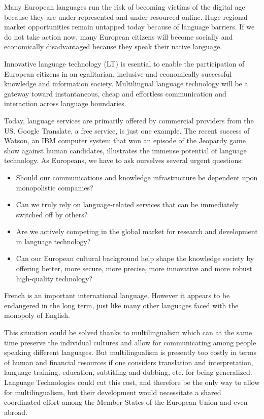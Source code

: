 \documentclass[]{../metanetpaper}
\begin{document}
\setcounter{section}{0}
\setcounter{figure}{0}

\cleardoublepage



\begin{multicols}{2}
Many European languages run the risk of becoming victims of the
digital age because they are under-represented and under-resourced
online. Huge regional market opportunities remain untapped today
because of language barriers. If we do not take action now, many
European citizens will become socially and economically disadvantaged
because they speak their native language.

Innovative language technology (LT) is esential to enable the
participation of European citizens in an egalitarian, inclusive and
economically successful knowledge and information
society. Multilingual language technology will be a gateway toward
instantaneous, cheap and effortless communication and interaction
across language boundaries.

Today, language services are primarily offered by commercial providers
from the US. Google Translate, a free service, is just one
example. The recent success of Watson, an IBM computer system that won
an episode of the Jeopardy game show against human candidates,
illustrates the immense potential of language technology. As
Europeans, we have to ask ourselves several urgent questions:
\begin{itemize}
\item Should our communications and knowledge infrastructure be
  dependent upon monopolistic companies?
\item Can we truly rely on language-related services that can be
  immediately switched off by others?
\item Are we actively competing in the global market for research and
  development in language technology?
\item Can our European cultural background help shape the knowledge
  society by offering better, more secure, more precise, more
  innovative and more robust high-quality technology?
\end{itemize}

French is an important international language. However it appears to
be endangered in the long term, just like many other languages faced
with the monopoly of English.

This situation could be solved thanks to multilingualism which can at
the same time preserve the individual cultures and allow for
communicating among people speaking different languages. But
multilingualism is presently too costly in terms of human and
financial resources if one considers translation and interpretation,
language training, education, subtitling and dubbing, etc. for being
generalized. Language Technologies could cut this cost, and therefore
be the only way to allow for multilingualism, but their development
would necessitate a shared coordinated effort among the Member States
of the European Union and even abroad.


\end{multicols}
\end{document}
